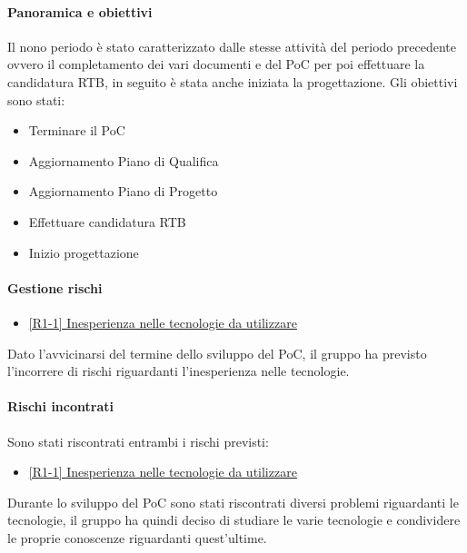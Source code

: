 \documentclass[a4paper,12pt]{article}
\begin{document}
            \paragraph{Panoramica e obiettivi}
            Il nono periodo è stato caratterizzato dalle stesse attività del periodo precedente ovvero il completamento dei vari documenti e del PoC per poi effettuare la candidatura RTB, in seguito è stata anche iniziata la progettazione. Gli obiettivi sono stati:
            \begin{itemize}
                \item Terminare il PoC
                \item Aggiornamento Piano di Qualifica
                \item Aggiornamento Piano di Progetto
                \item Effettuare candidatura RTB
                \item Inizio progettazione
            \end{itemize}
            
            \paragraph{Gestione rischi}
                \begin{itemize}
                \item\hyperref[tab:r1]{[R1-1] Inesperienza nelle tecnologie da utilizzare}
                \end{itemize}
                Dato l'avvicinarsi del termine dello sviluppo del PoC, il gruppo ha previsto l'incorrere di rischi riguardanti l'inesperienza nelle tecnologie.
    
                \paragraph*{Rischi incontrati}
                Sono stati riscontrati entrambi i rischi previsti:
                \\
                \begin{itemize}
                    \item \hyperref[tab:r1]{[R1-1] Inesperienza nelle tecnologie da utilizzare}
                \end{itemize}
                Durante lo sviluppo del PoC sono stati riscontrati diversi problemi riguardanti le tecnologie, il gruppo ha quindi deciso di studiare le varie tecnologie e condividere le proprie conoscenze riguardanti quest'ultime.
                
\end{document}
